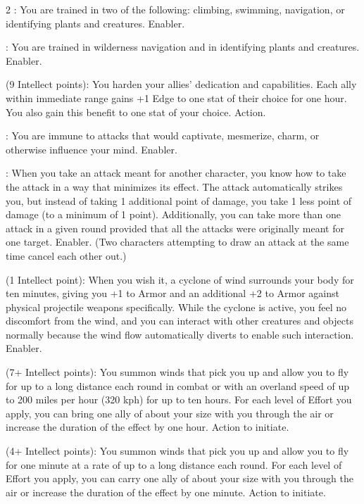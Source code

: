 \begin{multicols}{2}
: You are trained in two of the following: climbing, swimming, navigation, or identifying plants and creatures. Enabler. 
 
: You are trained in wilderness navigation and in identifying plants and creatures. Enabler. 
 
 (9 Intellect points): You harden your allies’ dedication and capabilities. Each ally within immediate range gains +1 Edge to one stat of their choice for one hour. You also gain this benefit to one stat of your choice. Action. 
 
: You are immune to attacks that would captivate, mesmerize, charm, or otherwise influence your mind. Enabler. 
 
: When you take an attack meant for another character, you know how to take the attack in a way that minimizes its effect. The attack automatically strikes you, but instead of taking 1 additional point of damage, you take 1 less point of damage (to a minimum of 1 point). Additionally, you can take more than one attack in a given round provided that all the attacks were originally meant for one target. Enabler. (Two characters attempting to draw an attack at the same time cancel each other out.)
 
 (1 Intellect point): When you wish it, a cyclone of wind surrounds your body for ten minutes, giving you +1 to Armor and an additional +2 to Armor against physical projectile weapons specifically. While the cyclone is active, you feel no discomfort from the wind, and you can interact with other creatures and objects normally because the wind flow automatically diverts to enable such interaction. Enabler. 
 
 (7+ Intellect points): You summon winds that pick you up and allow you to fly for up to a long distance each round in combat or with an overland speed of up to 200 miles per hour (320 kph) for up to ten hours. For each level of Effort you apply, you can bring one ally of about your size with you through the air or increase the duration of the effect by one hour. Action to initiate. 
 
 (4+ Intellect points): You summon winds that pick you up and allow you to fly for one minute at a rate of up to a long distance each round. For each level of Effort you apply, you can carry one ally of about your size with you through the air or increase the duration of the effect by one minute. Action to initiate. 
 

\end{multicols}
